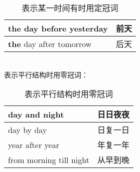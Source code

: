 \documentclass[UTF8]{ctexart}
\begin{document}
    \begin{table}[h!]
        \begin{center}
            \ttfamily
            \begin{tabular}{p{180pt}|p{100pt}}
                \hline
                \textbf{the} day before yesterday&前天\\ \hline
                \textbf{the} day after tomorrow&后天\\ \hline
            \end{tabular}
            \rmfamily
            \caption{表示某一时间有时用定冠词}
        \end{center}
    \end{table}\\
    表示平行结构时用零冠词：
    \begin{table}[h!]
        \begin{center}
            \ttfamily
            \begin{tabular}{p{180pt}|p{100pt}}
                \hline
                day and night&日日夜夜\\ \hline
                day by day&日复一日\\ \hline
                year after year&年复一年\\ \hline
                from morning till night&从早到晚\\ \hline
            \end{tabular}
            \rmfamily
            \caption{表示平行结构时用零冠词}
        \end{center}
    \end{table}

\newpage
\end{document}
